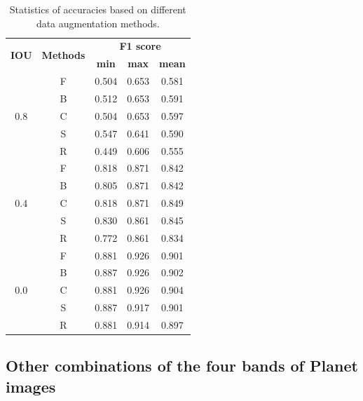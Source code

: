 \documentclass[preprint,12pt,authoryear]{elsarticle}
\begin{document}
\begin{table}[ht]
\centering
\footnotesize
\caption{Statistics of accuracies based on different data augmentation methods.}
\label{table_stastic_imgaug}
\begin{tabular}{c c c c  c  }
\toprule
\multirow{2}{*}{\textbf{IOU}}&\multirow{2}{*}{\textbf{Methods}}& \multicolumn{3}{c}{ \textbf{F1 score}} \\
 & &\textbf{min}&\textbf{max}&\textbf{mean}\\
\midrule
\multirow{5}{*}{0.8} &   F & 0.504 & 0.653 & 0.581 \\
  & B & 0.512 & 0.653 & 0.591\\
 & C & 0.504 & 0.653 & 0.597\\
 & S & 0.547 & 0.641 & 0.590\\
& R & 0.449 & 0.606 & 0.555 \\

\midrule
\multirow{5}{*}{0.4} &  F & 0.818 & 0.871 & 0.842 \\
 &  B & 0.805 & 0.871 & 0.842\\
 & C & 0.818 & 0.871 & 0.849\\
 & S & 0.830 & 0.861 & 0.845\\
& R & 0.772 & 0.861 & 0.834\\

\midrule
\multirow{5}{*}{0.0} & F & 0.881 & 0.926 & 0.901 \\
  &B & 0.887 & 0.926 & 0.902\\
  &C & 0.881 & 0.926 & 0.904\\
 &S & 0.887 & 0.917 & 0.901\\
&R & 0.881 & 0.914 & 0.897\\


\bottomrule
\end{tabular}
\end{table}

\subsection{Other combinations of the four bands of Planet images}
\label{subsec_otherbands}
\end{document}
